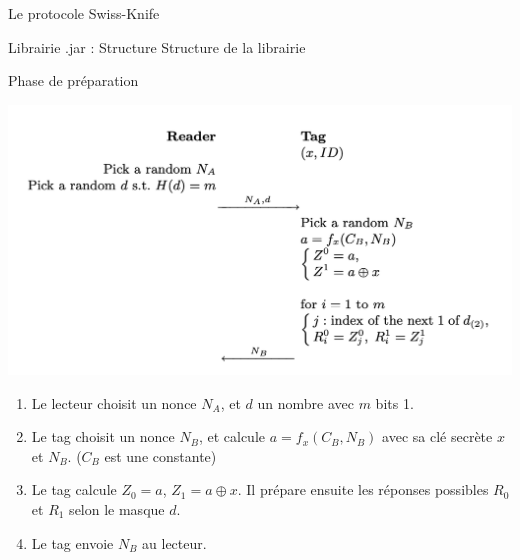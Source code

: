 \documentclass[aspectratio=169]{beamer}
\begin{document}
\begin{frame}{Le protocole Swiss-Knife}
  
  \centering

\end{frame}

\begin{frame}{Librairie .jar : Structure}
  Structure de la librairie
\end{frame}

\begin{frame}{Phase de préparation}
  \begin{multicols}{2}
    \begin{minipage}[c]{\linewidth}
      \centering
      \bigskip
      \medskip
      \includegraphics[width=\linewidth]{../assets/sk-phase1.png}
    \end{minipage}

    \begin{minipage}[t]{\linewidth}
      \begin{enumerate}
        \item Le lecteur choisit un nonce $N_A$, et $d$ un nombre avec $m$ bits 1.
        \item Le tag choisit un nonce $N_B$, et calcule $a = f_x(C_B, N_B)$ avec sa clé secrète $x$ et $N_B$. ($C_B$ est une constante)
        \item Le tag calcule $Z_0 = a$, $Z_1 = a \oplus x$. Il prépare ensuite les réponses possibles $R_0$ et $R_1$ selon le masque $d$.
        \item Le tag envoie $N_B$ au lecteur.
      \end{enumerate}
    \end{minipage}
  \end{multicols}
\end{frame}
\end{document}
